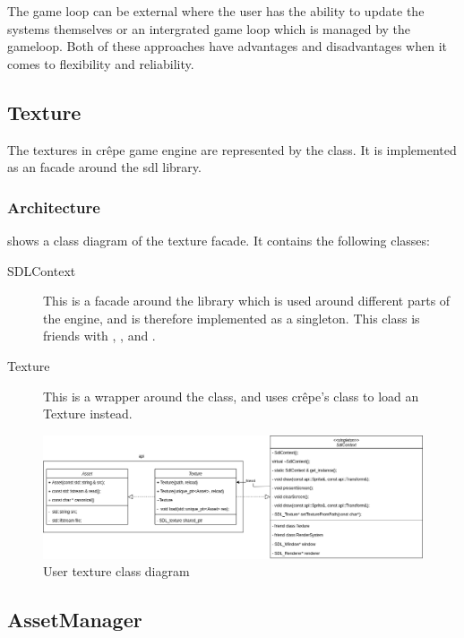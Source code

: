 \documentclass{projdoc}
\begin{document}
The game loop can be external where the user has the ability to update the systems
themselves or an intergrated game loop which is managed by the gameloop. Both of
these approaches have advantages and disadvantages when it comes to flexibility and
reliability.

\subsection{Texture}

The textures in cr\^epe game engine are represented by the 
class. It is implemented as an \gls{facade} around the \gls{sdl} library.

\subsubsection{Architecture}

 shows a class diagram of the texture \gls{facade}. It
contains the following classes:\noparbreak
\begin{description}
	\item[SDLContext] This is a facade around the  library which is
		used around different parts of the engine, and is therefore implemented as a
		singleton. This class is friends with ,
		,  and
		.
	\item[Texture] This is a wrapper around the  class, and
		uses cr\^epe's  class to load an Texture instead.
\end{description}

\begin{figure}
	\centering
	\includegraphics[width=\textwidth]{img/texture.png}
	\caption{User texture class diagram}
	\label{fig:class-texture}
\end{figure}

\subsection{AssetManager}
\end{document}
